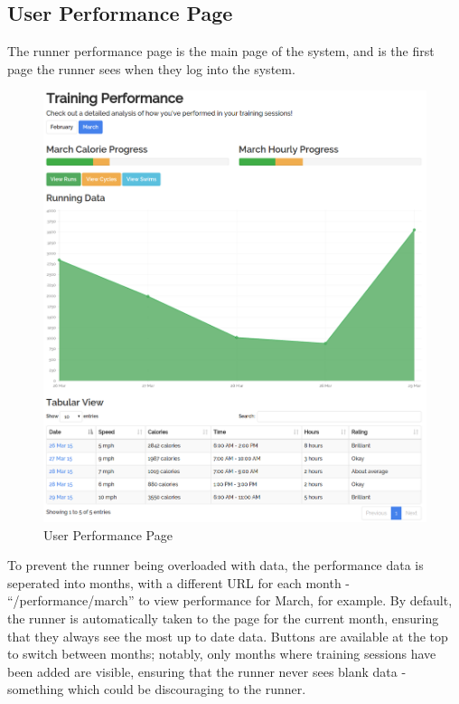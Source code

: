 \documentclass{article}[12pt,a4paper]
\begin{document}
\clearpage

\subsection{User Performance Page}
The runner performance page is the main page of the system, and is the first page the runner sees when they log into the system.

\begin{figure}[h!]
  \includegraphics[scale=0.35]{final_ui/user_performance}
  \caption{User Performance Page}
\end{figure}
\clearpage

To prevent the runner being overloaded with data, the performance data is seperated into months, with a different URL for each month - ``/performance/march'' to view performance for March, for example. By default, the runner is automatically taken to the page for the current month, ensuring that they always see the most up to date data. Buttons are available at the top to switch between months; notably, only months where training sessions have been added are visible, ensuring that the runner never sees blank data - something which could be discouraging to the runner.
\end{document}
